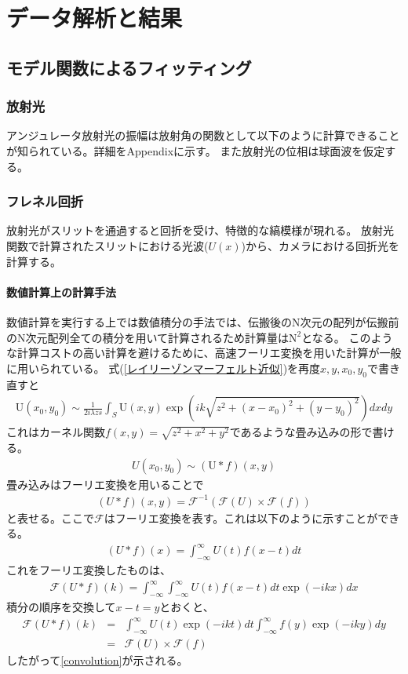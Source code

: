 \documentclass[a4paper,11pt,uplatex]{jsbook}
\begin{document}
\chapter{データ解析と結果}
\section{モデル関数によるフィッティング}
\subsection{放射光}
アンジュレータ放射光の振幅は放射角の関数として以下のように計算できることが知られている。詳細をAppendixに示す。
また放射光の位相は球面波を仮定する。

\subsection{フレネル回折}
放射光がスリットを通過すると回折を受け、特徴的な縞模様が現れる。
放射光関数で計算されたスリットにおける光波($U(x)$)から、カメラにおける回折光を計算する。

\subsubsection{数値計算上の計算手法}
数値計算を実行する上では数値積分の手法では、伝搬後のN次元の配列が伝搬前のN次元配列全ての積分を用いて計算されるため計算量は$\text{N}^2$となる。
このような計算コストの高い計算を避けるために、高速フーリエ変換を用いた計算が一般に用いられている。
式(\ref{レイリーゾンマーフェルト近似})を再度$x,y,x_0,y_0$で書き直すと
\begin{eqnarray}
  \text{U}(x_0,y_0) \sim \frac{1}{2i\lambda zs}\int_S \text{U}(x,y) \exp( ik \sqrt{z^2 + (x-x_0)^2 + (y-y_0)^2}) dxdy
\end{eqnarray}
これはカーネル関数$f(x,y) = \sqrt{z^2 +x^2 + y^2}$であるような畳み込みの形で書ける。
\begin{eqnarray}
  U(x_0,y_0) \sim (\text{U} * f)(x,y)
\end{eqnarray}
畳み込みはフーリエ変換を用いることで
\begin{eqnarray}
  (U*f)(x,y) = \mathcal{F}^{-1}(\mathcal{F}(U) \times \mathcal{F}(f)) \label{convolution}
\end{eqnarray}
と表せる。ここで$\mathcal{F}$はフーリエ変換を表す。これは以下のように示すことができる。
\begin{eqnarray}
  (U*f)(x) = \int_{-\infty}^{\infty} U(t)f(x-t)dt
\end{eqnarray}
これをフーリエ変換したものは、
\begin{eqnarray}
  \mathcal{F}(U*f)(k) = \int_{-\infty}^{\infty} \int_{-\infty}^{\infty} U(t)f(x-t)dt \exp(-ikx)dx
\end{eqnarray}
積分の順序を交換して$x-t = y$とおくと、
\begin{eqnarray}
  \mathcal{F}(U*f)(k) &=& \int_{-\infty}^{\infty} U(t) \exp(-ikt)dt \int_{-\infty}^{\infty} f(y) \exp(-iky)dy\\
  &=& \mathcal{F}(U) \times \mathcal{F}(f)
\end{eqnarray}
したがって\ref{convolution}が示される。
\end{document}
